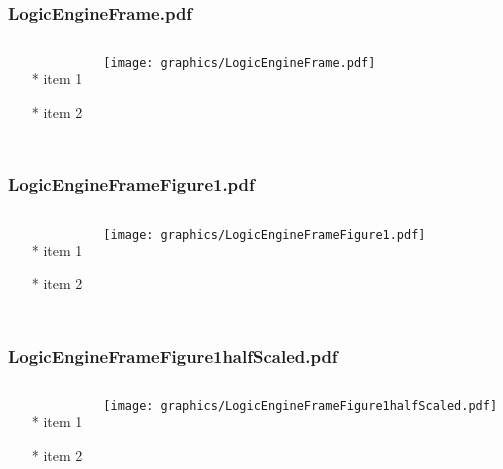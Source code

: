 \documentclass{beamer}
\begin{document}
\begin{frame} \frametitle{LogicEngineFrame.pdf}
    \begin{columns}[c]
        \begin{itemize}
            \item[*] item 1
            \item[*] item 2
        \end{itemize}
        \begin{minipage}{\linewidth}
            \begin{center}
            \texttt{[image: graphics/LogicEngineFrame.pdf]}
            \label{gfx:LogicEngineFrame.pdf}
            \end{center}
        \end{minipage}
    \end{columns}
\end{frame}
\begin{frame} \frametitle{LogicEngineFrameFigure1.pdf}
    \begin{columns}[c]
        \begin{itemize}
            \item[*] item 1
            \item[*] item 2
        \end{itemize}
        \begin{minipage}{\linewidth}
            \begin{center}
            \texttt{[image: graphics/LogicEngineFrameFigure1.pdf]}
            \label{gfx:LogicEngineFrameFigure1.pdf}
            \end{center}
        \end{minipage}
    \end{columns}
\end{frame}
\begin{frame} \frametitle{LogicEngineFrameFigure1halfScaled.pdf}
    \begin{columns}[c]
        \begin{itemize}
            \item[*] item 1
            \item[*] item 2
        \end{itemize}
        \begin{minipage}{\linewidth}
            \begin{center}
            \texttt{[image: graphics/LogicEngineFrameFigure1halfScaled.pdf]}
            \label{gfx:LogicEngineFrameFigure1halfScaled.pdf}
            \end{center}
        \end{minipage}
    \end{columns}
\end{frame}
\end{document}
